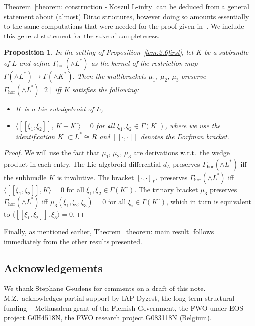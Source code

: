 \documentclass[10pt,a4paper]{amsart}
\numberwithin{equation}{section}
\newtheorem{Proposition}[Theorem]{Proposition}
 { \theoremstyle{definition}
\newtheorem{Definition}[Theorem]{Definition}
\newtheorem{Remark}[Theorem]{Remark} }
\newcommand{\hor}{\mathrm{hor}}
\newcommand{\oo}{[\![}
\newcommand{\cc}{]\!]}
\begin{document}
Theorem~\ref{theorem: construction - Koszul L-infty} can be deduced from a general statement about (almost) Dirac structures, however doing so amounts essentially to the same computations that were needed for the proof given in~\cite{SZPre}. We include this general statement for the sake of completeness.

\begin{Proposition}In the setting of Proposition~{\rm \ref{lem:2.6first}}, let $K$ be a subbundle of $L$ and define $\Gamma_{\hor}(\wedge L^*)$ as the kernel of the restriction map $\Gamma(\wedge L^*)\to \Gamma(\wedge K^*)$. Then the multibrackets $\mu_1$, $\mu_2$, $\mu_3$ preserve $\Gamma_{\hor}(\wedge L^*)[2]$ if{f} $K$ satisfies the following:
\begin{itemize}\itemsep=0pt
\item $K$ is a Lie subalgebroid of $L$,
\item $\langle \oo \xi_1 , \xi_2 \cc ,\, K+K^{\circ} \rangle=0$ for all $\xi_1 , \xi_2 \in \Gamma(K^{\circ})$, where we use the identification $K^{\circ}\subset L^*\cong R$ and $\oo \cdot,\cdot\cc$ denotes the Dorfman bracket.
\end{itemize}
\end{Proposition}
\begin{proof}We will use the fact that $\mu_1$, $\mu_2$, $\mu_3$ are derivations w.r.t.\ the wedge product in each entry. The Lie algebroid differential $d_L$ preserves $\Gamma_{\hor}(\wedge L^*) $ if{f} the subbundle $K$ is involutive. The bracket $[\cdot,\cdot]_{L^*}$ preserves $\Gamma_{\hor}(\wedge L^*) $ if{f} $\langle \oo \xi_1 , \xi_2 \cc, K\rangle=0$ for all $\xi_1 , \xi_2 \in \Gamma(K^{\circ})$. The trinary bracket $\mu_3$ preserves $\Gamma_{\hor}(\wedge L^*) $ if{f} $\mu_3(\xi_1,\xi_2,\xi_3)=0$ for all $\xi_i \in \Gamma(K^{\circ})$, which in turn is equivalent to $\langle \oo \xi_1 , \xi_2 \cc, \xi_3 \rangle=0$.
\end{proof}

Finally, as mentioned earlier, Theorem~\ref{theorem: main result} follows immediately from the other results presented.

\subsection*{Acknowledgements}We thank Stephane Geudens for comments on a draft of this note. M.Z.~acknowledges partial support by IAP Dygest, the long term structural funding -- Methusalem grant of the Flemish Government,
the FWO under EOS project G0H4518N, the FWO research project G083118N (Belgium).
\end{document}
